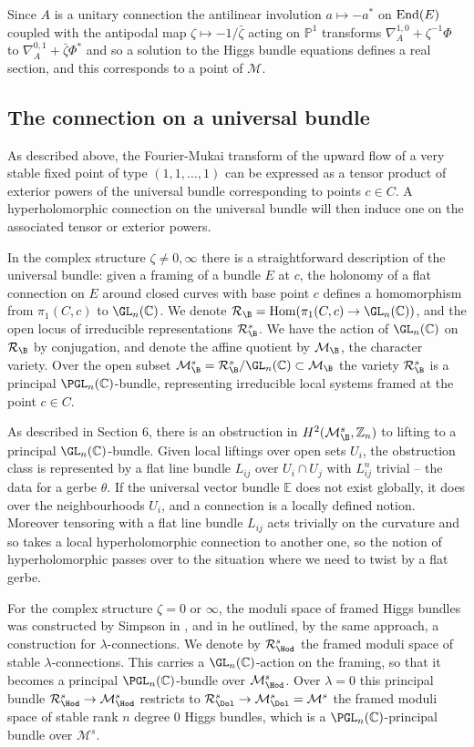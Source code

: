 \documentclass[12pt]{article}
\numberwithin{equation}{section}
\theoremstyle{remark}
\theoremstyle{definition}
\numberwithin{theorem}{section}
\DeclareMathOperator{\Hom}{Hom}
\def\C{\mathbb{C}}
\def\M{{\mathcal{M}}}
\def\Z{\mathbb{Z}}
\newcommand{\calR}{\mathcal{R}}
\newcommand{\End}{\textnormal{End}}
\renewcommand{\1}{\mathbbm{1}}
\def\PP {\mathbb{P}}
\begin{document}
Since $A$ is a unitary connection the antilinear involution $a\mapsto -a^*$ on $\End(E)$ coupled with the antipodal map $\zeta\mapsto -1/\bar \zeta$ acting on $\PP^1$ transforms $\nabla^{1,0} _A+ \zeta^{-1}\Phi$ to  $\nabla^{0,1}_A+\bar \zeta \Phi^*$ and so a solution to the Higgs bundle equations  defines a real section, and this corresponds to a point of $\M$. 



\subsection{The connection on a universal bundle}
As described above, the Fourier-Mukai transform of the upward flow of a very stable fixed point  of type $(1,1,\dots,1)$ can be expressed as a tensor product of exterior powers of the universal bundle corresponding to  points $c\in C$. A hyperholomorphic connection on the universal bundle will then induce one on the associated tensor or exterior powers. 

In the  complex structure  $\zeta \ne 0,\infty$ there is a straightforward description of  the universal bundle: given a framing of a bundle $E$ at $c$, the holonomy of a flat connection on $E$ around closed curves with base point $c$ defines a homomorphism from $\pi_1(C,c)$ to $\GL_n(\C)$.   We denote $\calR_\B=\Hom(\pi_1(C,c)\to \GL_n(\C))$, and the open locus of irreducible representations $\calR^s_\B$. We have the action of $\GL_n(\C)$ on $\calR_\B$ by conjugation, and denote the affine quotient by $\M_\B$, the character variety. Over the open subset $\M^s_\B=\calR^s_\B/\GL_n(\C)\subset \M_\B$ the  variety $\calR^s_\B$ is a principal $\PGL_n(\C)$-bundle, representing irreducible local systems framed at the point $c\in C$.

As described in Section 6, there is an obstruction in  $H^2({\M^s_\B}, \Z_n)$ to lifting to a  principal $\GL_n(\C)$-bundle. Given local liftings over  open sets $U_i$, the obstruction class is represented by a flat line bundle $L_{ij}$ over $U_i\cap U_j$ with $L_{ij}^n$ trivial -- the data for a gerbe $\theta$. If the universal vector bundle ${\mathbb E}$  does not exist globally, it  does over the neighbourhoods $U_i$, and a connection is a locally defined notion. Moreover tensoring with a flat line bundle $L_{ij}$ acts trivially on the curvature and so takes a local hyperholomorphic connection to another one, so the notion of hyperholomorphic passes over to the situation where we need to twist by a flat gerbe.

For the complex structure $\zeta=0$ or $\infty$, the moduli space of framed Higgs bundles was constructed by Simpson in    \cite[Theorem 4.10]{simpson1}, and in \cite[Proposition 4.1]{simpson3} he  outlined, by the same approach, a construction for $\lambda$-connections. We denote by $\calR^s_\Hod$ the framed moduli space of stable $\lambda$-connections. This carries a $\GL_n(\C)$-action on the framing, so that it becomes a  principal $\PGL_n(\C)$-bundle over $\M^s_\Hod$.  Over $\lambda=0$ this principal bundle $\calR^s_\Hod\to \M^s_\Hod$ restricts to $\calR^s_\Dol\to \M_\Dol^s=\M^s$  the framed moduli space of stable rank $n$ degree $0$ Higgs bundles, which is a $\PGL_n(\C)$-principal bundle over $\M^s$. 
\end{document}
